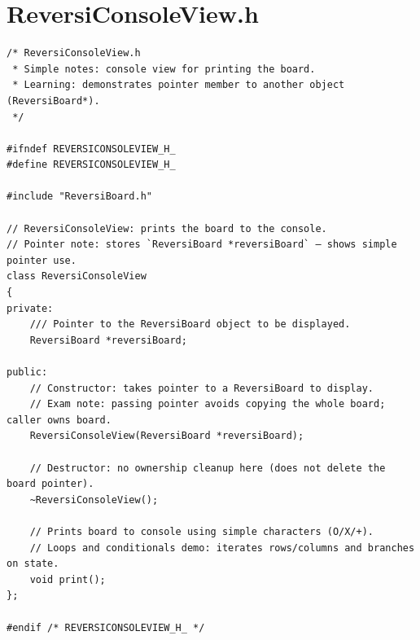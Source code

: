 \documentclass[11pt]{article}
\begin{document}
\section*{ReversiConsoleView.h}
\begin{lstlisting}
/* ReversiConsoleView.h
 * Simple notes: console view for printing the board.
 * Learning: demonstrates pointer member to another object (ReversiBoard*).
 */

#ifndef REVERSICONSOLEVIEW_H_
#define REVERSICONSOLEVIEW_H_

#include "ReversiBoard.h"

// ReversiConsoleView: prints the board to the console.
// Pointer note: stores `ReversiBoard *reversiBoard` — shows simple pointer use.
class ReversiConsoleView
{
private:
	/// Pointer to the ReversiBoard object to be displayed.
	ReversiBoard *reversiBoard;

public:
	// Constructor: takes pointer to a ReversiBoard to display.
	// Exam note: passing pointer avoids copying the whole board; caller owns board.
	ReversiConsoleView(ReversiBoard *reversiBoard);

	// Destructor: no ownership cleanup here (does not delete the board pointer).
	~ReversiConsoleView();

	// Prints board to console using simple characters (O/X/+).
	// Loops and conditionals demo: iterates rows/columns and branches on state.
	void print();
};

#endif /* REVERSICONSOLEVIEW_H_ */
\end{lstlisting}
\end{document}
